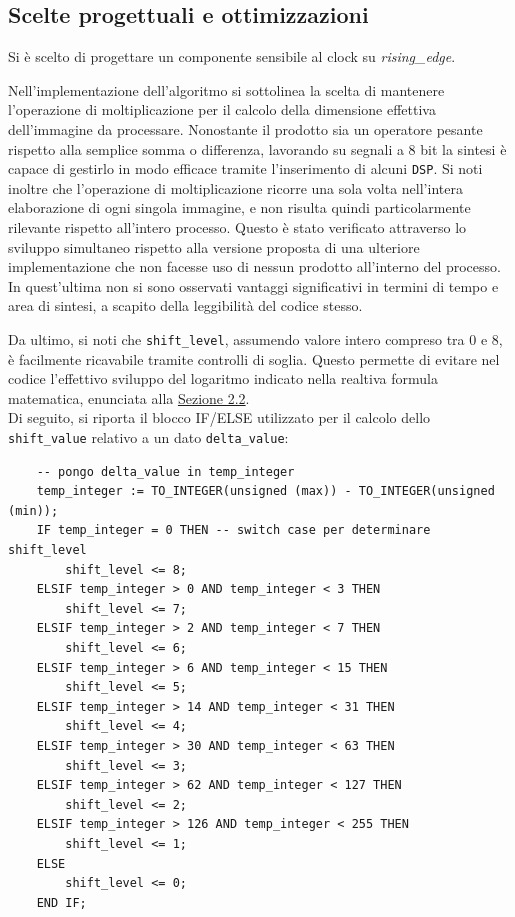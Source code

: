 \documentclass{article}
\begin{document}
\subsection{Scelte progettuali e ottimizzazioni} %
Si è scelto di progettare un componente sensibile al clock su \emph{rising\_edge}.\par
Nell’implementazione dell’algoritmo si sottolinea la scelta di mantenere l’operazione di moltiplicazione per il calcolo della dimensione effettiva dell’immagine da processare. Nonostante il prodotto sia un operatore pesante rispetto alla semplice somma o differenza, lavorando su segnali a 8 bit la sintesi è capace di gestirlo in modo efficace tramite l’inserimento di alcuni \texttt{DSP}\footnotemark.
Si noti inoltre che l’operazione di moltiplicazione ricorre una sola volta nell’intera elaborazione di ogni singola immagine, e non risulta quindi particolarmente rilevante rispetto all’intero processo. Questo è stato verificato attraverso lo sviluppo simultaneo rispetto alla versione proposta di una ulteriore implementazione che non facesse uso di nessun prodotto all’interno del processo. In quest’ultima non si sono osservati vantaggi significativi in termini di tempo e area di sintesi, a scapito della leggibilità del codice stesso.\par
Da ultimo, si noti che \texttt{shift\_level}, assumendo valore intero compreso tra 0 e 8, è facilmente ricavabile tramite controlli di soglia. Questo permette di evitare nel codice l’effettivo sviluppo del logaritmo indicato nella realtiva formula matematica, enunciata alla \hyperref[sec:appr]{Sezione 2.2}.\\
Di seguito, si riporta il blocco IF/ELSE utilizzato per il calcolo dello \texttt{shift\_value} relativo a un dato \texttt{delta\_value}:
\vspace{-.15cm}

\begin{verbatim}
    -- pongo delta_value in temp_integer
    temp_integer := TO_INTEGER(unsigned (max)) - TO_INTEGER(unsigned (min)); 
    IF temp_integer = 0 THEN -- switch case per determinare shift_level
        shift_level <= 8;
    ELSIF temp_integer > 0 AND temp_integer < 3 THEN
        shift_level <= 7;
    ELSIF temp_integer > 2 AND temp_integer < 7 THEN
        shift_level <= 6;
    ELSIF temp_integer > 6 AND temp_integer < 15 THEN
        shift_level <= 5;
    ELSIF temp_integer > 14 AND temp_integer < 31 THEN
        shift_level <= 4;
    ELSIF temp_integer > 30 AND temp_integer < 63 THEN
        shift_level <= 3;
    ELSIF temp_integer > 62 AND temp_integer < 127 THEN
        shift_level <= 2;
    ELSIF temp_integer > 126 AND temp_integer < 255 THEN
        shift_level <= 1;
    ELSE
        shift_level <= 0;
    END IF;
\end{verbatim}
\end{document}
